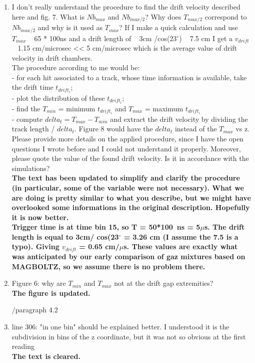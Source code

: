 \documentclass[a4paper,11pt,twoside]{article}
\begin{document}
\begin{enumerate}
\item I don't really understand the procedure to find the drift velocity 
   described here and fig. 7. What is $Nb_{max}$ and $Nb_{max/2}$? Why does 
   $T_{max/2}$ correspond to $Nb_{max/2}$ and why is it used as $T_{max}$? If I 
   make a quick calculation and use $T_{max}$ ~ 65 * 100ns and a drift length 
   of ~ 3cm /cos(23$^{\circ}$) ~ 7.5 cm I get a $v_{drift}$ ~ 1.15 cm/microsec 
   << 5 cm/microsec which is the average value of drift velocity in drift 
   chambers.\\
The procedure according to me would be:\\
- for each hit associated to a track, whose time information is available, take 
the drift time $t_{drift_{i}}$;\\
- plot the distribution of these $t_{drift_{i}}$;\\
- find the $T_{min}$ = minimum $t_{drift_{i}}$ and $T_{max}$ = maximum 
$t_{drift_{i}}$\\
- compute $delta_{t} = T_{max} - T_{min}$ and extract the drift velocity by 
dividing the track length / $delta_{t}$. Figure 8 would have the $delta_{t}$ 
instead of the $T_{max}$ vs z.\\
Please provide more details on the applied procedure, since I have the open 
questions I wrote before and I could not understand it properly. Moreover, 
please quote the value of the found drift velocity. Is it in accordance with 
the simulations?\\
{ \bf The text has been updated to simplify and clarify the procedure 
(in particular, some of the variable were not necessary). What we are doing is pretty 
similar to what you describe, but we might have overlooked some informations in the
original description. Hopefully it is now better.\\
Trigger time is at time bin 15, so T = 50*100~ns = 5$\mu$s.
The drift length is equal to 3cm/ cos(23$^{\circ}$ = 3.26 cm (I assume the 7.5 is a typo).
Giving $v_{drift}$ = 0.65 cm/$\mu$s. These values are exactly what was anticipated by
our early comparison of gaz mixtures based on MAGBOLTZ, so we assume there is no 
problem there.\\} 

\item Figure 6: why are $T_{min}$ and $T_{max}$ not at the drift gap 
   extremities?\\
   { \bf The figure is updated.} 

        /paragraph 4.2

\item line 306: "in one bin" should be explained better. I understood it is the 
   subdivision in bins of the z coordinate, but it was not so obvious at the 
   first reading\\
{ \bf The text is cleared.} 


\end{enumerate}
\end{document}
